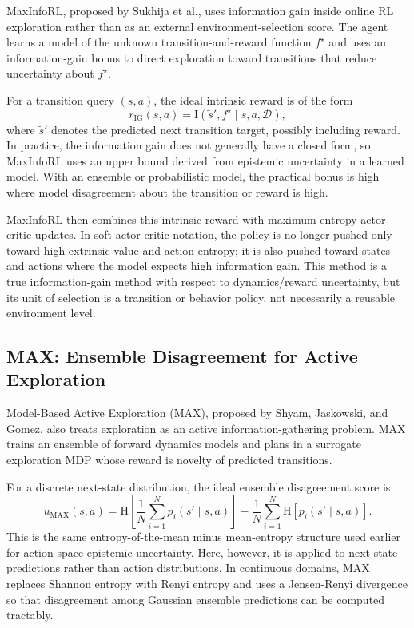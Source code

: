 \documentclass[11pt]{article}
\newcommand{\D}{\mathcal{D}}
\newcommand{\Hent}{\mathrm{H}}
\newcommand{\I}{\mathrm{I}}
\begin{document}
MaxInfoRL, proposed by Sukhija et al., uses information gain inside online RL
exploration rather than as an external environment-selection score. The agent
learns a model of the unknown transition-and-reward function $f^\star$ and uses
an information-gain bonus to direct exploration toward transitions that reduce
uncertainty about $f^\star$.

For a transition query $(s,a)$, the ideal intrinsic reward is of the form
\begin{equation}
  r_{\mathrm{IG}}(s,a)
  =
  \I(\tilde{s}', f^\star \mid s,a,\D),
\end{equation}
where $\tilde{s}'$ denotes the predicted next transition target, possibly
including reward. In practice, the information gain does not generally have a
closed form, so MaxInfoRL uses an upper bound derived from epistemic uncertainty
in a learned model. With an ensemble or probabilistic model, the practical bonus
is high where model disagreement about the transition or reward is high.

MaxInfoRL then combines this intrinsic reward with maximum-entropy actor-critic
updates. In soft actor-critic notation, the policy is no longer pushed only
toward high extrinsic value and action entropy; it is also pushed toward states
and actions where the model expects high information gain. This method is a true
information-gain method with respect to dynamics/reward uncertainty, but its
unit of selection is a transition or behavior policy, not necessarily a reusable
environment level.

\subsection{MAX: Ensemble Disagreement for Active Exploration}

Model-Based Active Exploration (MAX), proposed by Shyam, Jaskowski, and Gomez,
also treats exploration as an active information-gathering problem. MAX trains
an ensemble of forward dynamics models and plans in a surrogate exploration MDP
whose reward is novelty of predicted transitions.

For a discrete next-state distribution, the ideal ensemble disagreement score is
\begin{equation}
  u_{\mathrm{MAX}}(s,a)
  =
  \Hent\left[
    \frac{1}{N}\sum_{i=1}^{N}p_i(s' \mid s,a)
  \right]
  -
  \frac{1}{N}\sum_{i=1}^{N}
  \Hent[p_i(s' \mid s,a)].
\end{equation}
This is the same entropy-of-the-mean minus mean-entropy structure used earlier
for action-space epistemic uncertainty. Here, however, it is applied to next
state predictions rather than action distributions. In continuous domains, MAX
replaces Shannon entropy with Renyi entropy and uses a Jensen-Renyi divergence
so that disagreement among Gaussian ensemble predictions can be computed
tractably.
\end{document}
